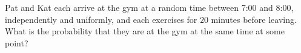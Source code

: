 Pat and Kat each arrive at the gym at a random time between 7:00 and 8:00, independently and uniformly, and each exercises for $20$ minutes before leaving. What is the probability that they are at the gym at the same time at some point?
